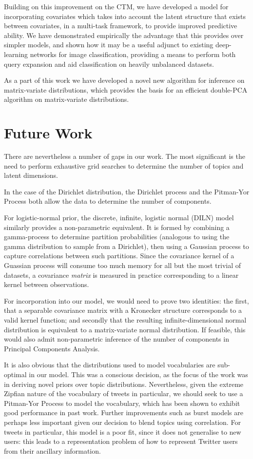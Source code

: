 Building on this improvement on the CTM, we have developed a model for incorporating covariates which takes into account the latent structure that exists between covariates, in a multi-task framework, to provide improved predictive ability. We have demonstrated empirically the advantage that this provides over simpler models\cite{Mimno2008}, and shown how it may be a useful adjunct to existing deep-learning networks for image classification, providing a means to perform both query expansion and aid classification on heavily unbalanced datasets.

As a part of this work we have developed a novel new algorithm for inference on matrix-variate distributions, which provides the basis for an efficient double-PCA algorithm on matrix-variate distributions.


\section{Future Work}
There are nevertheless a number of gaps in our work. The most significant is the need to perform exhaustive grid searches to determine the number of topics and latent dimensions.

In the case of the Dirichlet distribution, the Dirichlet process and the Pitman-Yor Process both allow the data to determine the number of components. 

For logistic-normal prior, the discrete, infinite, logistic normal (DILN) model\cite{Paisley2012b} similarly provides a non-parametric equivalent. It is formed by combining a gamma-process to determine partition probabilities (analogous to using the gamma distribution to sample from a Dirichlet), then using a Gaussian process to capture correlations between such partitions. Since the covariance kernel of a Guassian process will consume too much memory for all but the most trivial of datasets, a covariance \emph{matrix} is measured in practice corresponding to a linear kernel between observations.

For incorporation into our model, we would need to prove two identities: the first, that a separable covariance matrix with a Kronecker structure corresponds to a valid kernel function; and secondly that the resulting infinite-dimensional normal distribution is equivalent to a matrix-variate normal distribution. If feasible, this would also admit non-parametric inference of the number of components in Principal Components Analysis.

It is also obvious that the distributions used to model vocabularies are sub-optimal in our model. This was a conscious decision, as the focus of the work was in deriving novel priors over topic distributions. Nevertheless, given the extreme Zipfian nature of the vocabulary of tweets in particular, we should seek to use a Pitman-Yor Process to model the vocabulary, which has been shown to exhibit good performance in past work\cite{Buntine2014}. Further improvements such as burst models are perhaps less important given our decision to blend topics using correlation. For tweets in particular, this model is a poor fit, since it does not generalise to new users: this leads to a representation problem of how to represent Twitter users from their ancillary information.

